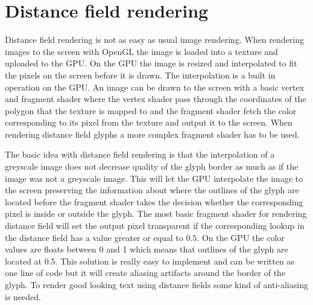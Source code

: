 \section{Distance field rendering}
Distance field rendering is not as easy as usual image rendering. When rendering images to the screen with OpenGL the image is loaded into a texture and uploaded to the GPU. On the GPU the image is resized and interpolated to fit the pixels on the screen before it is drawn. The interpolation is a built in operation on the GPU. An image can be drawn to the screen with a basic vertex and fragment shader where the vertex shader pass through the coordinates of the polygon that the texture is mapped to and the fragment shader fetch the color corresponding to its pixel from the texture and output it to the screen. When rendering distance field glyphs a more complex fragment shader has to be used.

The basic idea with distance field rendering is that the interpolation of a greyscale image does not decrease quality of the glyph border as much as if the image was not a greyscale image. This will let the GPU interpolate the image to the screen preserving the information about where the outlines of the glyph are located before the fragment shader takes the decision whether the corresponding pixel is inside or outside the glyph. The most basic fragment shader for rendering distance field will set the output pixel transparent if the corresponding lookup in the distance field has a value greater or equal to $0.5$. On the GPU the color values are floats between 0 and 1 which means that outlines of the glyph are located at 0.5. This solution is really easy to implement and can be written as one line of code but it will create aliasing artifacts around the border of the glyph. To render good looking text using distance fields some kind of anti-aliasing is needed. 

